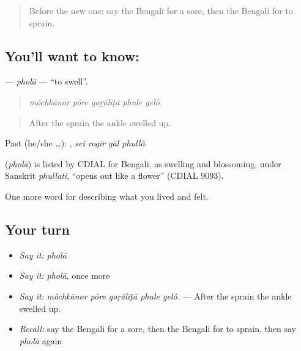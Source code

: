 \label{lesson:BN-C475-phola}



\begin{quote}
Before the new one: say the Bengali for a sore, then the Bengali for to sprain.
\end{quote}

\subsection*{You'll want to know: }
\textbf{} — \emph{pholā} — \textquotedblleft{}to swell\textquotedblright{}.

\begin{quote}
    
\end{quote}

\begin{quote}
\emph{môchkānor pôre goṛāliṭā phule gelô.}
\end{quote}

\begin{quote}
After the sprain the ankle swelled up.
\end{quote}

Past (he/she …):    , \emph{sei rogīr gāl phullô}.

\begin{cousinweb}
\textbf{} (\emph{pholā}) is listed by CDIAL for Bengali, as swelling and blossoming, under Sanskrit \emph{phullati}, \textquotedblleft{}opens out like a flower\textquotedblright{} (CDIAL 9093).
\end{cousinweb}

\begin{grammarlens}[title={What you've built}]
One more word for describing what you lived and felt.
\end{grammarlens}

\subsection*{Your turn}
\begin{itemize}
\raggedright
  \item \emph{Say it:} \emph{pholā}
  \item \emph{Say it:} \emph{pholā}, once more
  \item \emph{Say it:} \emph{môchkānor pôre goṛāliṭā phule gelô.} — After the sprain the ankle swelled up.
  \item \emph{Recall:} say the Bengali for a sore, then the Bengali for to sprain, then say \emph{pholā} again
\end{itemize}

